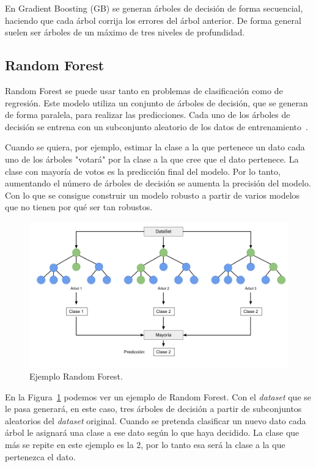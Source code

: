\documentclass[a4paper, 12pt]{book}
\begin{document}
En Gradient Boosting (GB) se generan árboles de decisión de forma secuencial, haciendo que cada árbol corrija los errores del árbol anterior. De forma general suelen ser árboles de un máximo de tres niveles de profundidad.

\subsection{Random Forest}
\label{subsec:random_forest}

Random Forest se puede usar tanto en problemas de clasificación como de regresión. Este modelo utiliza un conjunto de árboles de decisión, que se generan de forma paralela, para realizar las predicciones. Cada uno de los árboles de decisión se entrena con un subconjunto aleatorio de los datos de entrenamiento~\cite{James2021}. 

Cuando se quiera, por ejemplo, estimar la clase a la que pertenece un dato cada uno de los árboles "votará" por la clase a la que cree que el dato pertenece. La clase con mayoría de votos es la predicción final del modelo. Por lo tanto, aumentando el número de árboles de decisión se aumenta la precisión del modelo. Con lo que se consigue construir un modelo robusto a partir de varios modelos que no tienen por qué ser tan robustos.

\begin{figure}[htb]
  \centering
  \includegraphics[width=14cm, keepaspectratio]{img/ejemplo_randomForest.png}
  \caption{Ejemplo Random Forest.}\label{fig:ejemplo_rforest}
\end{figure}

En la Figura~\ref{fig:ejemplo_rforest} podemos ver un ejemplo de Random Forest. Con el \textit{dataset} que se le pasa generará, en este caso, tres árboles de decisión a partir de subconjuntos aleatorios del \textit{dataset} original. Cuando se pretenda clasificar un nuevo dato cada árbol le asignará una clase a ese dato según lo que haya decidido. La clase que más se repite en este ejemplo es la 2, por lo tanto esa será la clase a la que pertenezca el dato.
\end{document}

